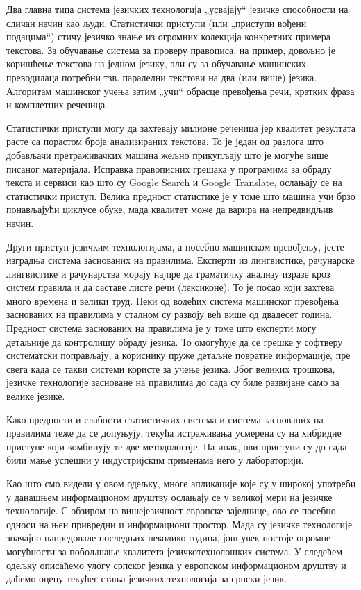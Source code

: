 {\begin{multicols}{2}
Два главна типа система језичких технологија „усвајају“ језичке способности на сличан начин као људи. Статистички приступи  (или „приступи вођени подацима“) стичу језичко знање из огромних колекција конкретних примера текстова. За обучавање система за проверу правописа, на пример, довољно је коришћење текстова на једном језику, али су за обучавање машинских преводилаца потребни тзв. паралелни текстови на два (или више) језика. Алгоритам машинског учења затим „учи“ обрасце превођења речи, кратких фраза и комплетних реченица. 

Статистички приступи могу да захтевају милионе реченица јер квалитет резултата расте са порастом броја анализираних текстова. То је један од разлога што добављачи претраживачких машина жељно прикупљају што је могуће више писаног материјала. Исправка правописних грешака у програмима за обраду текста и сервиси као што су Google Search и  Google Translate, ослањају се на статистички приступ. Велика предност статистике је у томе што машина учи брзо по\-нав\-ља\-ју\-ћи циклусе обуке, мада квалитет може да варира на непредвидљив начин. 

Други приступ језичким технологијама, а посебно машинском превођењу, јесте изградња система заснованих на правилима. Експерти из лингвистике, рачунарске лингвистике и рачунарства морају најпре да граматичку анализу изразе кроз систем правила и да саставе листе речи (лексиконе). То је посао који захтева много времена и велики труд. Неки од водећих система машинског превођења заснованих на правилима у сталном су развоју већ више од двадесет година. Предност система заснованих на правилима је у томе што експерти могу детаљније да контролишу обраду језика. То омогућује да се грешке у софтверу систематски поправљају, а кориснику пруже детаљне повратне информације, пре свега када се такви системи користе за учење језика. Због великих трошкова, језичке технологије засноване на правилима до сада су биле развијане само за велике језике.  

Како предности и слабости статистичких система и система заснованих на правилима теже да се допуњују, текућа истраживања усмерена су на хибридне приступе који комбинују те две методологије. Па ипак, ови приступи су до сада били мање успешни у индустријским применама него у лабораторији. 

Као што смо видели у овом одељку, многе апликације које су у широкој употреби у данашњем информационом друштву ослањају се у великој мери на језичке технологије. С обзиром на вишејезичност европске заједнице, ово се посебно односи на њен привредни и информациони простор. Мада су језичке технологије значајно напредовале последњих неколико година, још увек постоје огромне могућности за побољшање квалитета језичкотехнолошких система. У следећем одељку описаћемо улогу српског језика у европском информационом друштву и даћемо оцену текућег стања језичких технологија за српски језик. 


\end{multicols}}
